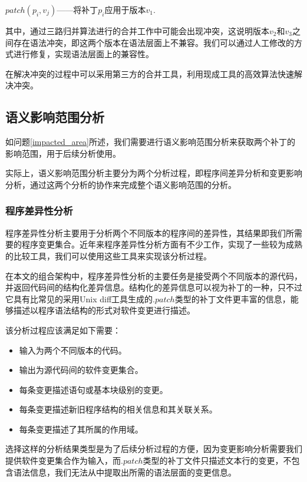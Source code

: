 \begin{definition}
	\label {define_patch}
	$patch(p_i,v_j)$——将补丁$p_i$应用于版本$v_1$.
\end{definition}

其中，通过三路归并算法进行的合并工作中可能会出现冲突，这说明版本$v_2$和$v_3$之间存在语法冲突，即这两个版本在语法层面上不兼容。我们可以通过人工修改的方式进行修复，实现语法层面上的兼容性。

在解决冲突的过程中可以采用第三方的合并工具，利用现成工具的高效算法快速解决冲突。

\subsection{语义影响范围分析}

如问题\ref {impacted_area}所述，我们需要进行语义影响范围分析来获取两个补丁的影响范围，用于后续分析使用。

实际上，语义影响范围分析主要分为两个分析过程，即程序间差异分析和变更影响分析，通过这两个分析的协作来完成整个语义影响范围的分析。

\subsubsection{程序差异性分析}

程序差异性分析主要用于分析两个不同版本的程序间的差异性，其结果即我们所需要的程序变更集合。近年来程序差异性分析方面有不少工作，实现了一些较为成熟的比较工具，我们可以使用这些工具来实现该分析过程。

在本文的组合架构中，程序差异性分析的主要任务是接受两个不同版本的源代码，并返回代码间的结构化差异信息。结构化的差异信息可以视为补丁的一种，只不过它具有比常见的采用Unix diff工具生成的$.patch$类型的补丁文件更丰富的信息，能够描述以程序语法结构的形式对软件变更进行描述。

该分析过程应该满足如下需要：
\begin{itemize}
	\item 输入为两个不同版本的代码。
	\item 输出为源代码间的软件变更集合。
	\item 每条变更描述语句或基本块级别的变更。
	\item 每条变更描述新旧程序结构的相关信息和其关联关系。
	\item 每条变更描述了其所属的作用域。
\end{itemize}

选择这样的分析结果类型是为了后续分析过程的方便，因为变更影响分析需要我们提供软件变更集合作为输入，而$.patch$类型的补丁文件只描述文本行的变更，不包含语法信息，我们无法从中提取出所需的语法层面的变更信息。

